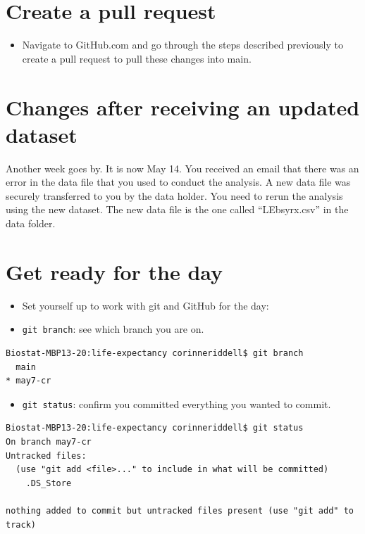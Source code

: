 \documentclass[
]{book}
\providecommand{\tightlist}{%
  \setlength{\itemsep}{0pt}\setlength{\parskip}{0pt}}
\begin{document}
\hypertarget{create-a-pull-request}{%
\section{Create a pull request}\label{create-a-pull-request}}

\begin{itemize}
\tightlist
\item
  Navigate to GitHub.com and go through the steps described previously to
  create a pull request to pull these changes into main.
\end{itemize}

\hypertarget{changes-after-receiving-an-updated-dataset}{%
\section{Changes after receiving an updated dataset}\label{changes-after-receiving-an-updated-dataset}}

Another week goes by. It is now May 14. You received an email that there was an
error in the data file that you used to conduct the analysis. A new data file
was securely transferred to you by the data holder. You need to rerun the analysis
using the new dataset. The new data file is the one called ``LEbsyrx.csv'' in the
data folder.

\hypertarget{get-ready-for-the-day}{%
\section{Get ready for the day}\label{get-ready-for-the-day}}

\begin{itemize}
\item
  Set yourself up to work with git and GitHub for the day:
\item
  \texttt{git\ branch}: see which branch you are on.
\end{itemize}

\begin{verbatim}
Biostat-MBP13-20:life-expectancy corinneriddell$ git branch
  main
* may7-cr
\end{verbatim}

\begin{itemize}
\tightlist
\item
  \texttt{git\ status}: confirm you committed everything you wanted to commit.
\end{itemize}

\begin{verbatim}
Biostat-MBP13-20:life-expectancy corinneriddell$ git status
On branch may7-cr
Untracked files:
  (use "git add <file>..." to include in what will be committed)
    .DS_Store

nothing added to commit but untracked files present (use "git add" to track)
\end{verbatim}
\end{document}
